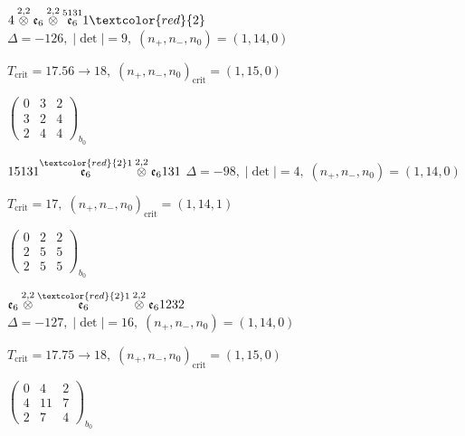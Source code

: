 \documentclass[10pt]{article}
\begin{document}
\smallskip

$4\overset{2,2}{\otimes}\mathfrak{e}_6\overset{2,2}{\otimes}\overset{5131}{\mathfrak{e}_6}1\textcolor{red}{2}$ \quad $\Delta=-126,\; |\det|=9,\; (n_+,n_-,n_0)=(1,14,0)$

\hspace{1em}$T_{\text{crit}}=17.56 \to 18,\; (n_+,n_-,n_0)_{\text{crit}}=(1,15,0)$

\hspace{2em}$\left(\begin{smallmatrix}0 & 3 & 2 \\ 3 & 2 & 4 \\ 2 & 4 & 4\end{smallmatrix}\right)_{\!b_0}$

\smallskip

$15131\overset{\textcolor{red}{2}1}{\mathfrak{e}_6}\overset{2,2}{\otimes}\mathfrak{e}_6131$ \quad $\Delta=-98,\; |\det|=4,\; (n_+,n_-,n_0)=(1,14,0)$

\hspace{1em}$T_{\text{crit}}=17,\; (n_+,n_-,n_0)_{\text{crit}}=(1,14,1)$

\hspace{2em}$\left(\begin{smallmatrix}0 & 2 & 2 \\ 2 & 5 & 5 \\ 2 & 5 & 5\end{smallmatrix}\right)_{\!b_0}$

\smallskip

$\mathfrak{e}_6\overset{2,2}{\otimes}\overset{\textcolor{red}{2}1}{\mathfrak{e}_6}\overset{2,2}{\otimes}\mathfrak{e}_61232$ \quad $\Delta=-127,\; |\det|=16,\; (n_+,n_-,n_0)=(1,14,0)$

\hspace{1em}$T_{\text{crit}}=17.75 \to 18,\; (n_+,n_-,n_0)_{\text{crit}}=(1,15,0)$

\hspace{2em}$\left(\begin{smallmatrix}0 & 4 & 2 \\ 4 & 11 & 7 \\ 2 & 7 & 4\end{smallmatrix}\right)_{\!b_0}$
\end{document}
